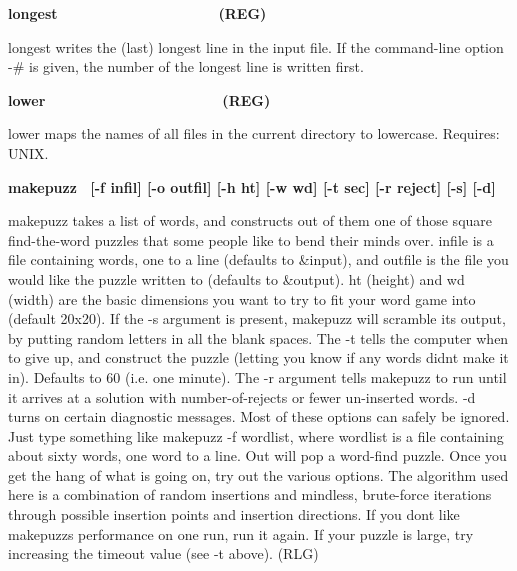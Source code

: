 {\sffamily\bfseries
longest\ \ \ \ \ \ \ \ \ \ \ \ \ \ \ \ \ \ \ \ (REG)}

\textsf{longest} writes the (last) longest line in the input file. If
the command-line option -\# is given, the number of the longest line is
written first. 

{\sffamily\bfseries
lower\ \ \ \ \ \ \ \ \ \ \ \ \ \ \ \ \ \ \ \ \ \ (REG)}

\textsf{lower} maps the names of all files in the current directory to
lowercase. Requires: UNIX. 

{\sffamily\bfseries
makepuzz \ \textrm{\textmd{[-f}}\textmd{
}\textrm{\textmd{infil]}}\textmd{ }\textrm{\textmd{[-o}}\textmd{
}\textrm{\textmd{outfil]}}\textmd{ }\textrm{\textmd{[-h}}\textmd{
}\textrm{\textmd{ht]}}\textmd{ }\textrm{\textmd{[-w}}\textmd{
}\textrm{\textmd{wd]}}\textmd{ }\textrm{\textmd{[-t}}\textmd{
}\textrm{\textmd{sec]}}\textmd{ }\textrm{\textmd{[-r}}\textmd{
}\textrm{\textmd{reject]}}\textmd{ }\textrm{\textmd{[-s]}}\textmd{
}\textrm{\textmd{[-d]}}}

\textsf{makepuzz} takes a list of words, and constructs out of them one
of those square find-the-word puzzles that some people like to bend
their minds over. infile is a file containing words, one to a line
(defaults to \textsf{\&input}), and outfile is the file you would like
the puzzle written to (defaults to \textsf{\&output}). \textsf{ht}
(height) and \textsf{wd} (width) are the basic dimensions you want to
try to fit your word game into (default 20x20). If the \textsf{{}-s}
argument is present, \textsf{makepuzz} will scramble its output, by
putting random letters in all the blank spaces. The \textsf{{}-t} tells
the computer when to give up, and construct the puzzle (letting you
know if any words didn{\textquotesingle}t make it in). Defaults to 60
(i.e. one minute). The \textsf{{}-r} argument tells \textsf{makepuzz}
to run until it arrives at a solution with number-of-rejects or fewer
un-inserted words. \textsf{{}-d} turns on certain diagnostic messages.
Most of these options can safely be ignored. Just type something like
\textsf{makepuzz -f wordlist}, where \textsf{wordlist} is a file
containing about sixty words, one word to a line. Out will pop a
{\textquotedbl}word-find{\textquotedbl} puzzle. Once you get the hang
of what is going on, try out the various options. The algorithm used
here is a combination of random insertions and mindless, brute-force
iterations through possible insertion points and insertion directions.
If you don{\textquotesingle}t like \textsf{makepuzz}{\textquotesingle}s
performance on one run, run it again. If your puzzle is large, try
increasing the timeout value (see \textsf{{}-t} above). (RLG)

